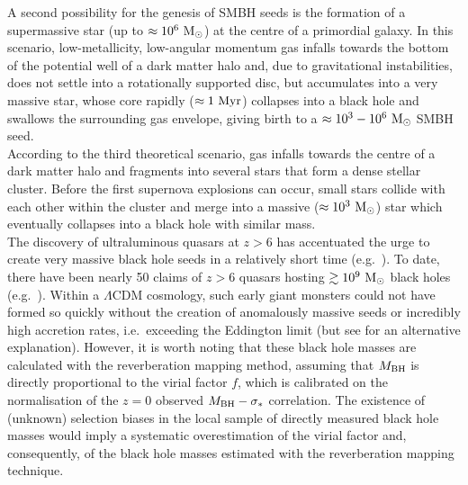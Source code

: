 A second possibility for the genesis of SMBH seeds is the formation of a supermassive star (up to $\approx 10^6~\rm M_\odot$) 
at the centre of a primordial galaxy. 
In this scenario, low-metallicity, low-angular momentum gas infalls towards the bottom of the potential well of a dark matter halo and, 
due to gravitational instabilities, does not settle into a rotationally supported disc, 
but accumulates into a very massive star, 
whose core rapidly ($\approx 1~\rm Myr$) collapses into a black hole and swallows the surrounding gas envelope, 
giving birth to a $\approx 10^3 - 10^6~\rm M_\odot$ SMBH seed. \\

According to the third theoretical scenario, gas infalls towards the centre of a dark matter halo and fragments into several stars
that form a dense stellar cluster. 
Before the first supernova explosions can occur, small stars collide with each other within the cluster 
and merge into a massive ($\approx 10^3~\rm M_\odot$) star which eventually collapses into a black hole with similar mass. \\

The discovery of ultraluminous quasars at $z>6$ has accentuated the urge to create very massive black hole seeds in a relatively short time 
(e.g.~\citealt{alexandernatarajan2014,madau2014,lupi2016}). 
To date, there have been nearly 50 claims of $z>6$ quasars hosting $\gtrsim 10^9~\rm M_\odot$ black holes 
(e.g.~\citealt{fan2003,jiang2007,mortlock2011,banados2014,trakhtenbrot2015,wu2015}). 
Within a $\Lambda$CDM cosmology, such early giant monsters could not have formed so quickly 
without the creation of anomalously massive seeds 
or incredibly high accretion rates, i.e.~exceeding the Eddington limit 
(but see \citealt{meliamcclintock2015} for an alternative explanation). 
However, it is worth noting that these black hole masses are calculated with the reverberation mapping method, 
assuming that $M_{\rm BH}$ is directly proportional to the virial factor $f$, 
which is calibrated on the normalisation of the $z=0$ observed $M_{\rm BH} - \sigma_*$ correlation. 
The existence of (unknown) selection biases in the local sample of directly measured black hole masses 
would imply a systematic overestimation of the virial factor and, consequently, 
of the black hole masses estimated with the reverberation mapping technique. \\


